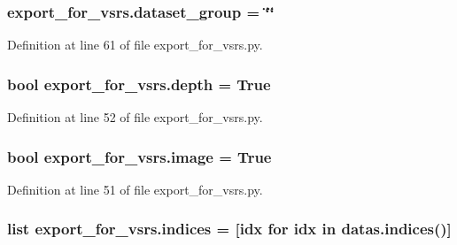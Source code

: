 \subsubsection[{\texorpdfstring{dataset\+\_\+group}{dataset_group}}]{\setlength{\rightskip}{0pt plus 5cm}export\+\_\+for\+\_\+vsrs.\+dataset\+\_\+group = \char`\"{}\char`\"{}}\hypertarget{namespaceexport__for__vsrs_a297c8c592252592340006c68ab0ca00c}{}\label{namespaceexport__for__vsrs_a297c8c592252592340006c68ab0ca00c}


Definition at line 61 of file export\+\_\+for\+\_\+vsrs.\+py.

\subsubsection[{\texorpdfstring{depth}{depth}}]{\setlength{\rightskip}{0pt plus 5cm}bool export\+\_\+for\+\_\+vsrs.\+depth = True}\hypertarget{namespaceexport__for__vsrs_a42168d88de1f21a9d3e767d54e3b93f3}{}\label{namespaceexport__for__vsrs_a42168d88de1f21a9d3e767d54e3b93f3}


Definition at line 52 of file export\+\_\+for\+\_\+vsrs.\+py.

\subsubsection[{\texorpdfstring{image}{image}}]{\setlength{\rightskip}{0pt plus 5cm}bool export\+\_\+for\+\_\+vsrs.\+image = True}\hypertarget{namespaceexport__for__vsrs_ad5a496494e734ba71579653b24aa1f48}{}\label{namespaceexport__for__vsrs_ad5a496494e734ba71579653b24aa1f48}


Definition at line 51 of file export\+\_\+for\+\_\+vsrs.\+py.

\subsubsection[{\texorpdfstring{indices}{indices}}]{\setlength{\rightskip}{0pt plus 5cm}list export\+\_\+for\+\_\+vsrs.\+indices = \mbox{[}idx for idx in datas.\+indices()\mbox{]}}\hypertarget{namespaceexport__for__vsrs_a53ea65c4d85ec7f9158c71ec7b1e7848}{}\label{namespaceexport__for__vsrs_a53ea65c4d85ec7f9158c71ec7b1e7848}


